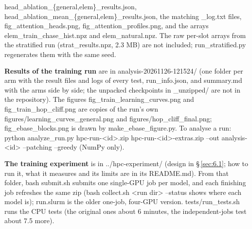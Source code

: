 \documentclass[paper=a4,fontsize=11pt,DIV=11,parskip=half,headings=small,numbers=noendperiod]{scrartcl}
\DeclareRobustCommand{\lead}[1]{\textsf{\bfseries\color{accent}#1}}
\DeclareRobustCommand{\code}[1]{{\fontseries{m}\ttfamily #1}}
\begin{document}
{\code{head\_\allowbreak{}ablation\_\allowbreak{}\{general,elem\}\_\allowbreak{}results.\allowbreak{}json},
\code{head\_\allowbreak{}ablation\_\allowbreak{}mean\_\allowbreak{}\{general,elem\}\_\allowbreak{}results.\allowbreak{}json},
the matching \code{*\_\allowbreak{}log.\allowbreak{}txt} files,
\code{fig\_\allowbreak{}attention\_\allowbreak{}heads.\allowbreak{}png},
\code{fig\_\allowbreak{}attention\_\allowbreak{}profiles.\allowbreak{}png}, and the arrays
\code{elem\_\allowbreak{}train\_\allowbreak{}chase\_\allowbreak{}hist.\allowbreak{}npz} and
\code{elem\_\allowbreak{}natural.\allowbreak{}npz}. The raw per-slot arrays from the stratified run
(\code{strat\_\allowbreak{}results.\allowbreak{}npz}, 2.3 MB) are not included;
\code{run\_\allowbreak{}stratified.\allowbreak{}py} regenerates them with the same seed.\par}

{\raggedright \lead{Results of the training run} are in
\code{analysis-\allowbreak{}20261126-\allowbreak{}121524/} (one folder per arm with the result files and logs of
every test, \code{run\_\allowbreak{}info.\allowbreak{}json}, and \code{summary.\allowbreak{}md} with the arms
side by side; the unpacked checkpoints in \code{\_\allowbreak{}unzipped/} are not in the repository). The
figures \code{fig\_\allowbreak{}train\_\allowbreak{}learning\_\allowbreak{}curves.\allowbreak{}png} and
\code{fig\_\allowbreak{}train\_\allowbreak{}hop\_\allowbreak{}cliff.\allowbreak{}png} are copies of the run’s
own \code{figures/\allowbreak{}learning\_\allowbreak{}curves\_\allowbreak{}general.\allowbreak{}png} and
\code{figures/\allowbreak{}hop\_\allowbreak{}cliff\_\allowbreak{}final.\allowbreak{}png};
\code{fig\_\allowbreak{}ebase\_\allowbreak{}blocks.\allowbreak{}png} is drawn by
\code{make\_\allowbreak{}ebase\_\allowbreak{}figure.\allowbreak{}py}. To analyse a run: \code{python
analyze\_\allowbreak{}run.\allowbreak{}py hpc-\allowbreak{}run-<id>.\allowbreak{}zip
hpc-\allowbreak{}run-<id>-\allowbreak{}extras.\allowbreak{}zip --\allowbreak{}out analysis-<id>
--\allowbreak{}patching --\allowbreak{}greedy} (NumPy only).\par}

{\raggedright \lead{The training experiment} is in \code{../\allowbreak{}hpc-\allowbreak{}experiment/} (design
in \S\,\ref{sec:6.1}; how to run it, what it measures and its limits are in its \code{README.\allowbreak{}md}).
From that folder, \code{bash submit.\allowbreak{}sh} submits one single-GPU job per model, and each finishing
job refreshes the same zip (\code{bash collect.\allowbreak{}sh <run dir> --\allowbreak{}status} shows where each
model is); \code{run.\allowbreak{}slurm} is the older one-job, four-GPU version.
\code{tests/\allowbreak{}run\_\allowbreak{}tests.\allowbreak{}sh} runs the CPU tests (the original ones about 6
minutes, the independent-jobs test about 7.5 more).\par}
\end{document}
